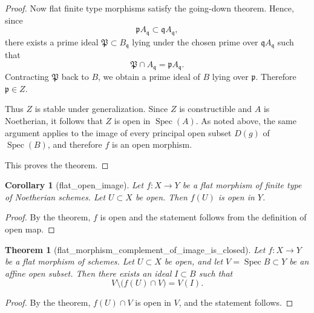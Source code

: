 \documentclass{article}
\newtheorem{theorem}{Theorem}
\newtheorem{corollary}{Corollary}
\begin{document}
\begin{proof}
Now flat finite type morphisms satisfy the going-down theorem. Hence, since
\[
\mathfrak p A_{\mathfrak q} \subset \mathfrak q A_{\mathfrak q},
\]
there exists a prime ideal $\mathfrak P \subset B_{\mathfrak q}$ lying under the chosen prime over $\mathfrak q A_{\mathfrak q}$ such that
\[
\mathfrak P \cap A_{\mathfrak q} = \mathfrak p A_{\mathfrak q}.
\]
Contracting $\mathfrak P$ back to $B$, we obtain a prime ideal of $B$ lying over $\mathfrak p$. Therefore $\mathfrak p \in Z$.

Thus $Z$ is stable under generalization. Since $Z$ is constructible and $A$ is Noetherian, it follows that $Z$ is open in $\operatorname{Spec}(A)$. As noted above, the same argument applies to the image of every principal open subset $D(g)$ of $\operatorname{Spec}(B)$, and therefore $f$ is an open morphism.

This proves the theorem.
\end{proof}



\begin{corollary}[flat_open_image]
Let \(f \colon X \to Y\) be a flat morphism of finite type of Noetherian schemes. Let \(U \subset X\) be open. Then $f(U)$ is open in $Y$.
\end{corollary}

\begin{proof}
By the theorem, $f$ is open and the statement follows from the definition of open map. 
\end{proof}

\begin{theorem}[flat_morphism_complement_of_image_is_closed]
Let \(f \colon X \to Y\) be a flat morphism of schemes. Let \(U \subset X\) be open, and let
\(V = \operatorname{Spec} B \subset Y\) be an affine open subset. Then there exists an ideal
\(I \subset B\) such that
\[
V \setminus \bigl(f(U) \cap V\bigr) = V(I).
\]
\end{theorem}

\begin{proof}
By the theorem, $f(U) \cap V$ is open in $V$, and the statement follows. 
\end{proof}
\end{document}
